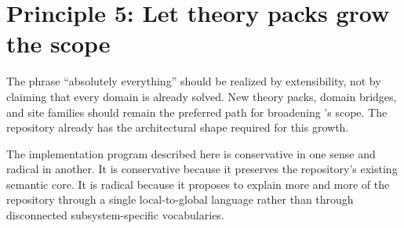 \section*{Principle 5: Let theory packs grow the scope}
The phrase ``absolutely everything'' should be realized by extensibility, not by claiming
that every domain is already solved. New theory packs, domain bridges, and site families
should remain the preferred path for broadening \DepPy{}'s scope. The repository already
has the architectural shape required for this growth.

\begin{remark}
The implementation program described here is conservative in one sense and radical in
another. It is conservative because it preserves the repository's existing semantic core.
It is radical because it proposes to explain more and more of the repository through a
single local-to-global language rather than through disconnected subsystem-specific
vocabularies.
\end{remark}
